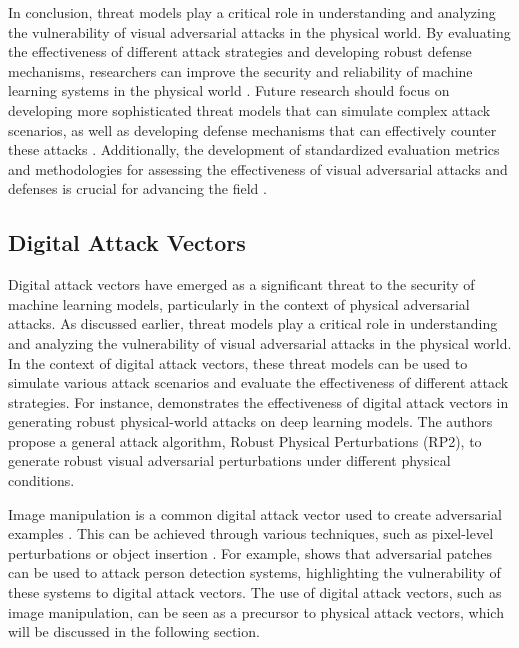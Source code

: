 \documentclass[11pt,a4paper]{article}
\begin{document}
In conclusion, threat models play a critical role in understanding and analyzing the vulnerability of visual adversarial attacks in the physical world. By evaluating the effectiveness of different attack strategies and developing robust defense mechanisms, researchers can improve the security and reliability of machine learning systems in the physical world \cite{doi:10.1049/cit2.12028}. Future research should focus on developing more sophisticated threat models that can simulate complex attack scenarios, as well as developing defense mechanisms that can effectively counter these attacks \cite{doi:10.1109/access.2022.3208131}. Additionally, the development of standardized evaluation metrics and methodologies for assessing the effectiveness of visual adversarial attacks and defenses is crucial for advancing the field \cite{arxiv:2010.09670}.


\subsection{Digital Attack Vectors}


Digital attack vectors have emerged as a significant threat to the security of machine learning models, particularly in the context of physical adversarial attacks. As discussed earlier, threat models play a critical role in understanding and analyzing the vulnerability of visual adversarial attacks in the physical world. In the context of digital attack vectors, these threat models can be used to simulate various attack scenarios and evaluate the effectiveness of different attack strategies. For instance, \cite{arxiv:1707.08945} demonstrates the effectiveness of digital attack vectors in generating robust physical-world attacks on deep learning models. The authors propose a general attack algorithm, Robust Physical Perturbations (RP2), to generate robust visual adversarial perturbations under different physical conditions.

Image manipulation is a common digital attack vector used to create adversarial examples \cite{doi:10.24963/ijcai.2021/694}. This can be achieved through various techniques, such as pixel-level perturbations or object insertion \cite{doi:10.1109/access.2018.2807385}. For example, \cite{doi:10.1109/cvprw.2019.00012} shows that adversarial patches can be used to attack person detection systems, highlighting the vulnerability of these systems to digital attack vectors. The use of digital attack vectors, such as image manipulation, can be seen as a precursor to physical attack vectors, which will be discussed in the following section.
\end{document}
